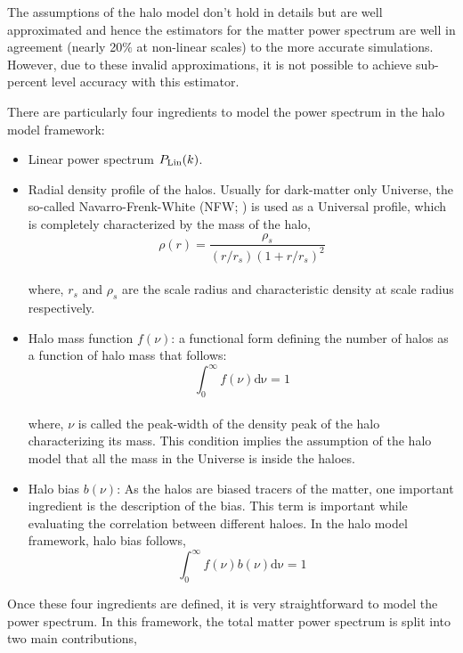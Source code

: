 The assumptions of the halo model don't hold in details but are well approximated and 
hence the estimators for the matter power spectrum are well in agreement 
(nearly 20$\%$ at non-linear scales)
to the more accurate simulations. However, due to these invalid approximations, it is not
possible to achieve sub-percent level accuracy with this estimator. 

There are particularly four ingredients to model the power spectrum in the halo model framework:

\begin{itemize}
	\item Linear power spectrum $P_{\rm Lin}(k)$.

	\item Radial density profile of the halos. 
			Usually for dark-matter only 	Universe, the so-called
			Navarro-Frenk-White (NFW; \cite{1997ApJ...490..493N}) 
			is used as a Universal profile, which is completely characterized by the
			mass of the halo,
			\begin{equation}
				\rho(r) = \dfrac{\rho_s}{(r/r_s)(1+r/r_s)^2}
			\end{equation}
			\\
			where, $r_s$ and $\rho_s$ are the scale radius and characteristic density at scale radius
			respectively.

	\item Halo mass function $f(\nu)$: a functional form defining the number of halos as a function of halo
			mass that follows:
			\begin{equation}
				\int_0^{\infty} f(\nu)\mathrm{d\nu} = 1
			\end{equation}
			\\
			where, $\nu$ is called the peak-width of the density peak of the halo 
			characterizing its mass. This condition implies the assumption of the
			halo model that all the mass in the Universe is inside the haloes. 

	\item Halo bias $b(\nu)$: As the halos are biased tracers of the matter, one important ingredient is 
			the description of the bias. This term is important while evaluating the correlation
			between different haloes. In the halo model framework, halo bias follows,
			\begin{equation}
				\int_0^{\infty} f(\nu) b(\nu) \mathrm{d\nu} = 1
			\end{equation}
\end{itemize}

Once these four ingredients are defined, 
it is very straightforward to model the power spectrum. In this framework, the
total matter power spectrum is split into two main contributions,

